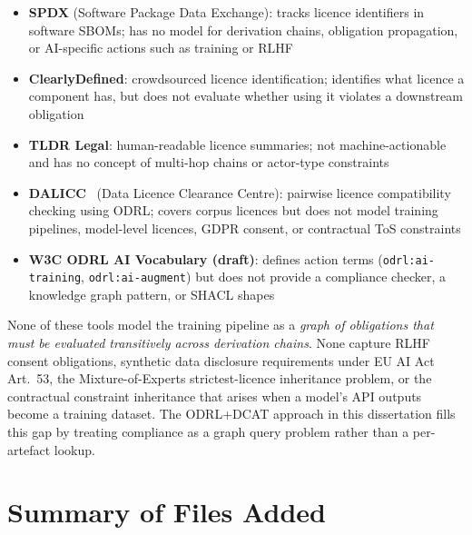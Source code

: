\documentclass[12pt,a4paper]{article}
\begin{document}
\begin{itemize}[noitemsep]
  \item \textbf{SPDX} (Software Package Data Exchange): tracks licence identifiers in software SBOMs; has no model for derivation chains, obligation propagation, or AI-specific actions such as training or RLHF
  \item \textbf{ClearlyDefined}: crowdsourced licence identification; identifies what licence a component has, but does not evaluate whether using it violates a downstream obligation
  \item \textbf{TLDR Legal}: human-readable licence summaries; not machine-actionable and has no concept of multi-hop chains or actor-type constraints
  \item \textbf{DALICC}~\cite{dalicc} (Data Licence Clearance Centre): pairwise licence compatibility checking using ODRL; covers corpus licences but does not model training pipelines, model-level licences, GDPR consent, or contractual ToS constraints
  \item \textbf{W3C ODRL AI Vocabulary (draft)}: defines action terms (\texttt{odrl:ai-training}, \texttt{odrl:ai-augment}) but does not provide a compliance checker, a knowledge graph pattern, or SHACL shapes
\end{itemize}

None of these tools model the training pipeline as a \emph{graph of obligations that must be evaluated transitively across derivation chains}. None capture RLHF consent obligations, synthetic data disclosure requirements under EU AI Act Art.\ 53, the Mixture-of-Experts strictest-licence inheritance problem, or the contractual constraint inheritance that arises when a model's API outputs become a training dataset. The ODRL+DCAT approach in this dissertation fills this gap by treating compliance as a graph query problem rather than a per-artefact lookup.

\newpage

\section{Summary of Files Added}
\end{document}
